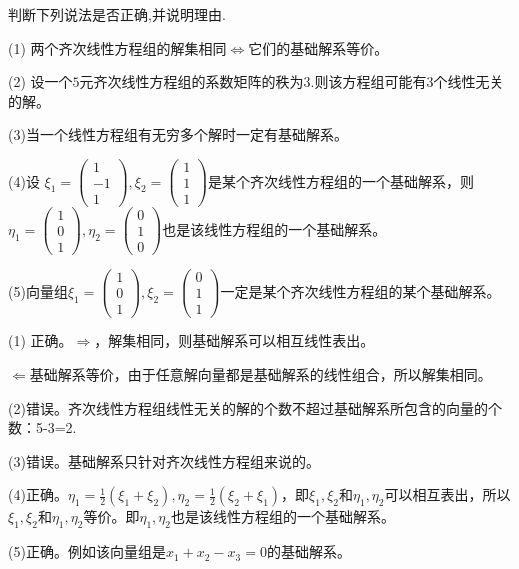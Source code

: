 \documentclass[a4paper]{report}
\begin{document}
\EX 判断下列说法是否正确,并说明理由.

(1) 两个齐次线性方程组的解集相同$\Leftrightarrow$它们的基础解系等价。

(2) 设一个$5$元齐次线性方程组的系数矩阵的秩为$3$.则该方程组可能有$3$个线性无关的解。

(3)当一个线性方程组有无穷多个解时一定有基础解系。

(4)设
$
\xi_1=
\begin{pmatrix}
1\\-1 \\1
\end{pmatrix},\xi_2=
\begin{pmatrix}
1\\1 \\1
\end{pmatrix}
$是某个齐次线性方程组的一个基础解系，则$
\eta_1=
\begin{pmatrix}
1\\0 \\1
\end{pmatrix},\eta_2=
\begin{pmatrix}
0\\1 \\0
\end{pmatrix}
$也是该线性方程组的一个基础解系。

(5)向量组$
\xi_1=\begin{pmatrix}
1\\0 \\1
\end{pmatrix},\xi_2=
\begin{pmatrix}
0\\1 \\1
\end{pmatrix}
$一定是某个齐次线性方程组的某个基础解系。

\begin{jie}
(1) 正确。$\Rightarrow$，解集相同，则基础解系可以相互线性表出。

$\Leftarrow$基础解系等价，由于任意解向量都是基础解系的线性组合，所以解集相同。

(2)错误。齐次线性方程组线性无关的解的个数不超过基础解系所包含的向量的个数：5-3=2.

(3)错误。基础解系只针对齐次线性方程组来说的。

(4)正确。$\eta_1=\frac{1}{2}(\xi_1+\xi_2),\eta_2=\frac{1}{2}(\xi_2+\xi_1)$，即$\xi_1,\xi_2$和$\eta_1,\eta_2$可以相互表出，所以$\xi_1,\xi_2$和$\eta_1,\eta_2$等价。即$\eta_1,\eta_2$也是该线性方程组的一个基础解系。

(5)正确。例如该向量组是$x_1+x_2-x_3=0$的基础解系。
\end{jie}
\end{document}
